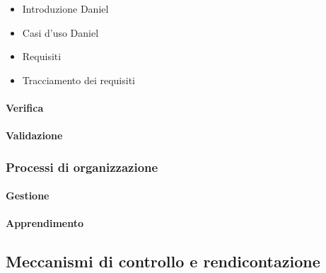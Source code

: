 						\begin{itemize}
						\item{Introduzione} Daniel
						\item{Casi d'uso} Daniel
						\item{Requisiti} 
						\item{Tracciamento dei requisiti} 
						\end{itemize}
			\paragraph {Verifica}%
			\paragraph {Validazione}%
		\subsubsection {Processi di organizzazione}
			\paragraph {Gestione}
			\paragraph {Apprendimento}
	\subsection {Meccanismi di controllo e rendicontazione} %